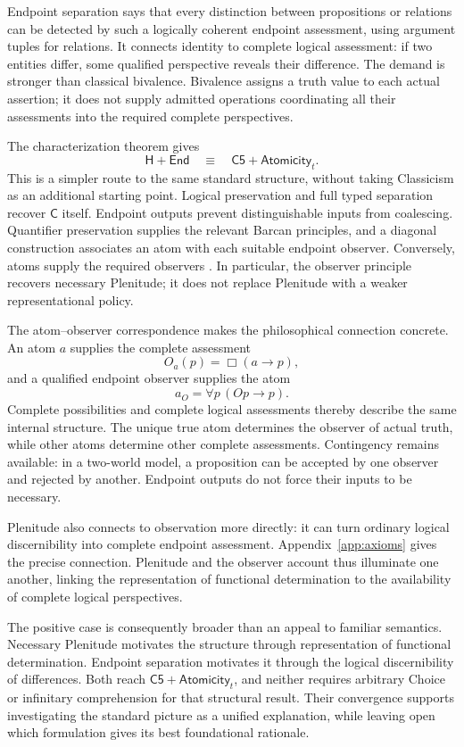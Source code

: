 \documentclass[12pt,letterpaper]{article}
\newcommand{\Hlogic}{\mathsf H}
\newcommand{\C}{\mathsf C}
\newcommand{\Cfive}{\mathsf{C5}}
\newcommand{\EndSep}{\mathsf{End}}
\newcommand{\At}{\mathsf{Atomicity}}
\begin{document}
Endpoint separation says that every distinction between propositions or relations can be detected by such a logically coherent endpoint assessment, using argument tuples for relations. It connects identity to complete logical assessment: if two entities differ, some qualified perspective reveals their difference. The demand is stronger than classical bivalence. Bivalence assigns a truth value to each actual assertion; it does not supply admitted operations coordinating all their assessments into the required complete perspectives.

The characterization theorem gives
\[
 \Hlogic+\EndSep\quad\equiv\quad\Cfive+\At_t.
\]
This is a simpler route to the same standard structure, without taking Classicism as an additional starting point. Logical preservation and full typed separation recover $\C$ itself. Endpoint outputs prevent distinguishable inputs from coalescing. Quantifier preservation supplies the relevant Barcan principles, and a diagonal construction associates an atom with each suitable endpoint observer. Conversely, atoms supply the required observers \citep[\S\S1--3]{observers}. In particular, the observer principle recovers necessary Plenitude; it does not replace Plenitude with a weaker representational policy.

The atom--observer correspondence makes the philosophical connection concrete. An atom $a$ supplies the complete assessment
\[
 O_a(p)=\Box(a\to p),
\]
and a qualified endpoint observer supplies the atom
\[
 a_O=\forall p\,(Op\to p).
\]
Complete possibilities and complete logical assessments thereby describe the same internal structure. The unique true atom determines the observer of actual truth, while other atoms determine other complete assessments. Contingency remains available: in a two-world model, a proposition can be accepted by one observer and rejected by another. Endpoint outputs do not force their inputs to be necessary.

Plenitude also connects to observation more directly: it can turn ordinary logical discernibility into complete endpoint assessment. Appendix~\ref{app:axioms} gives the precise connection. Plenitude and the observer account thus illuminate one another, linking the representation of functional determination to the availability of complete logical perspectives.

The positive case is consequently broader than an appeal to familiar semantics. Necessary Plenitude motivates the structure through representation of functional determination. Endpoint separation motivates it through the logical discernibility of differences. Both reach $\Cfive+\At_t$, and neither requires arbitrary Choice or infinitary comprehension for that structural result. Their convergence supports investigating the standard picture as a unified explanation, while leaving open which formulation gives its best foundational rationale.
\end{document}
